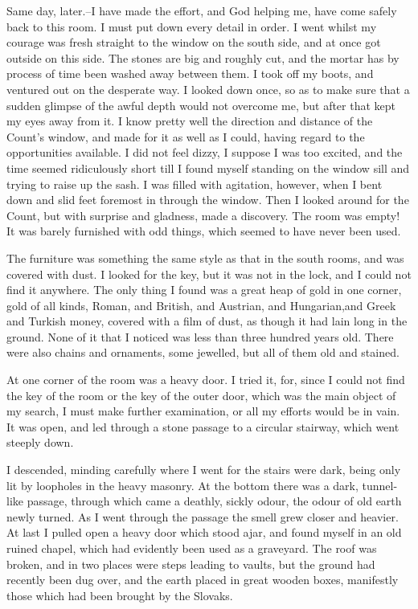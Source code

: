 Same day, later.--I have made the effort, and God helping me, have come safely back to this room. I must put down every detail in order. I went whilst my courage was fresh straight to the window on the south side, and at once got outside on this side. The stones are big and roughly cut, and the mortar has by process of time been washed away between them. I took off my boots, and ventured out on the desperate way. I looked down once, so as to make sure that a sudden glimpse of the awful depth would not overcome me, but after that kept my eyes away from it. I know pretty well the direction and distance of the Count's window, and made for it as well as I could, having regard to the opportunities available. I did not feel dizzy, I suppose I was too excited, and the time seemed ridiculously short till I found myself standing on the window sill and trying to raise up the sash. I was filled with agitation, however, when I bent down and slid feet foremost in through the window. Then I looked around for the Count, but with surprise and gladness, made a discovery. The room was empty! It was barely furnished with odd things, which seemed to have never been used. 

The furniture was something the same style as that in the south rooms, and was covered with dust. I looked for the key, but it was not in the lock, and I could not find it anywhere. The only thing I found was a great heap of gold in one corner, gold of all kinds, Roman, and British, and Austrian, and Hungarian,and Greek and Turkish money, covered with a film of dust, as though it had lain long in the ground. None of it that I noticed was less than three hundred years old. There were also chains and ornaments, some jewelled, but all of them old and stained. 

At one corner of the room was a heavy door. I tried it, for, since I could not find the key of the room or the key of the outer door, which was the main object of my search, I must make further examination, or all my efforts would be in vain. It was open, and led through a stone passage to a circular stairway, which went steeply down. 

I descended, minding carefully where I went for the stairs were dark, being only lit by loopholes in the heavy masonry. At the bottom there was a dark, tunnel-like passage, through which came a deathly, sickly odour, the odour of old earth newly turned. As I went through the passage the smell grew closer and heavier. At last I pulled open a heavy door which stood ajar, and found myself in an old ruined chapel, which had evidently been used as a graveyard. The roof was broken, and in two places were steps leading to vaults, but the ground had recently been dug over, and the earth placed in great wooden boxes, manifestly those which had been brought by the Slovaks. 


